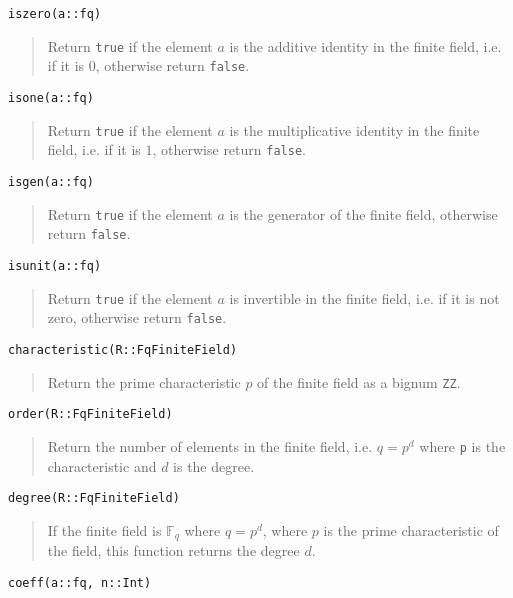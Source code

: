 \documentclass[a4paper,10pt]{article}
\newcommand{\F}{\mathbb{F}}
\newcommand{\code}{\lstinline}
\newcommand{\desc}[1]{\vspace{-3mm}\begin{quote}#1\end{quote}}
\begin{document}
{{\begin{lstlisting}
iszero(a::fq)
\end{lstlisting}

\desc{Return \code{true} if the element $a$ is the additive identity in the
finite field, i.e. if it is $0$, otherwise return \code{false}.}

\begin{lstlisting}
isone(a::fq)
\end{lstlisting}

\desc{Return \code{true} if the element $a$ is the multiplicative identity in
the finite field, i.e. if it is $1$, otherwise return \code{false}.}

\begin{lstlisting}
isgen(a::fq)
\end{lstlisting}

\desc{Return \code{true} if the element $a$ is the generator of the finite field,
otherwise return \code{false}.}

\begin{lstlisting}
isunit(a::fq)
\end{lstlisting}

\desc{Return \code{true} if the element $a$ is invertible in the finite field,
i.e. if it is not zero, otherwise return \code{false}.}

\begin{lstlisting}
characteristic(R::FqFiniteField)
\end{lstlisting}

\desc{Return the prime characteristic $p$ of the finite field as a bignum
\code{ZZ}.}

\begin{lstlisting}
order(R::FqFiniteField)
\end{lstlisting}

\desc{Return the number of elements in the finite field, i.e. $q = p^d$
where \code{p} is the characteristic and $d$ is the degree.}

\begin{lstlisting}
degree(R::FqFiniteField)
\end{lstlisting}

\desc{If the finite field is $\F_q$ where $q = p^d$, where $p$ is the
prime characteristic of the field, this function returns the degree
$d$.}

\begin{lstlisting}
coeff(a::fq, n::Int)
\end{lstlisting}

}}
\end{document}

